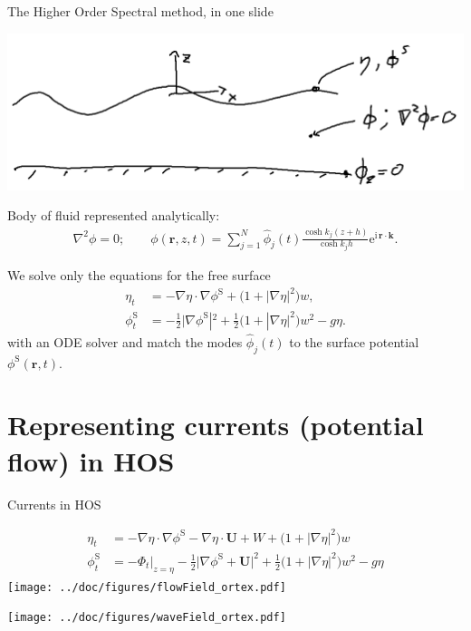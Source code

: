 \documentclass{sintefbeamer}
\newcommand{\mr}{\mathrm}
\renewcommand{\S}{^\mr{S}}
\newcommand{\ii}{\mr{i}\,}
\newcommand{\ee}{\mr{e}}
\renewcommand{\_}[1]{_\mr{#1}}
\newcommand{\w}{w}
\newcommand{\bU}{\bm U}
\begin{document}
\begin{frame}{The Higher Order Spectral method, in one slide}
\vspace{-1cm}
\begin{center}
\includegraphics[width=.5\framewidth]{HOS1.png}
\end{center}

Body of fluid represented analytically:
\begin{align*}
\nabla^2\phi = 0;\qquad  \phi(\bm r,z,t) = \sum_{j=1}^N \hat\phi_j(t) \frac{\cosh k_j(z+h)}{\cosh k_j h} \ee^{\ii \bm r \cdot \bm k}.
\end{align*}

We solve only the equations for the free surface 
\begin{align*}
\eta_t &=   - \nabla\eta\cdot\nabla\phi\S     + \big(1+|\nabla\eta|^2\big)\w, %
\\
\phi\S_t &= - \frac12\big|\nabla\phi\S|^2 + \frac12\big(1+|\nabla\eta|^2\big)\w^2 - g\eta.
\end{align*}
with an ODE solver and match the modes $\hat\phi_j(t) $ to the surface potential $\phi\S(\bm r,t)$.
\end{frame}


\section{Representing currents (potential flow) in HOS}

\begin{frame}{Currents in HOS}
\centering
\vspace{-1.cm}
\begin{minipage}{.5\framewidth}
\scriptsize
	\begin{align*}
\eta_t &=   - \nabla\eta\cdot\nabla\phi\S  - \nabla\eta\cdot\bU + W  + \big(1+|\nabla\eta|^2\big)\w
\\
\phi\S_t &= -\Phi_t\big|_{z=\eta} - \frac12\big|\nabla\phi\S +\bU\big|^2 + \frac12\big(1+|\nabla\eta|^2\big)\w^2 - g\eta
\end{align*}
\normalsize 
\texttt{[image: ../doc/figures/flowField\_vortex.pdf]}%
\end{minipage}%
\texttt{[image: ../doc/figures/waveField\_vortex.pdf]}%
\end{frame}
\end{document}
